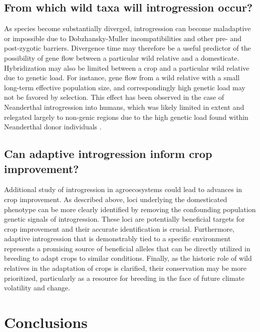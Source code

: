 \documentclass[11pt]{article}
\begin{document}
\subsection*{From which wild taxa will introgression occur?}
As species become substantially diverged, introgression can become maladaptive or impossible due to Dobzhansky-Muller incompatibilities and other pre- and post-zygotic barriers.
Divergence time may therefore be a useful predictor of the possibility of gene flow between a particular wild relative and a domesticate.
Hybridization may also be limited between a crop and a particular wild relative due to genetic load. 
For instance, gene flow from a wild relative with a small long-term effective population size, and correspondingly high genetic load may not be favored by selection.
This effect has been observed in the case of Neanderthal introgression into humans, which was likely limited in extent and relegated largely to non-genic regions due to the high genetic load found within Neanderthal donor individuals \cite{harris2016genetic}.

\subsection*{Can adaptive introgression inform crop improvement?}

Additional study of introgression in agroecosystems could lead to advances in crop improvement.
As described above, loci underlying the domesticated phenotype can be more clearly identified by removing the confounding population genetic signals of introgression.
These loci are potentially beneficial targets for crop improvement and their accurate identification is crucial.
Furthermore, adaptive introgression that is demonstrably tied to a specific environment represents a promising source of beneficial alleles that can be directly utilized in breeding to adapt crops to similar conditions.
Finally, as the historic role of wild relatives in the adaptation of crops is clarified, their conservation may be more prioritized, particularly as a resource for breeding in the face of future climate volatility and change.

\section*{Conclusions}
\end{document}
